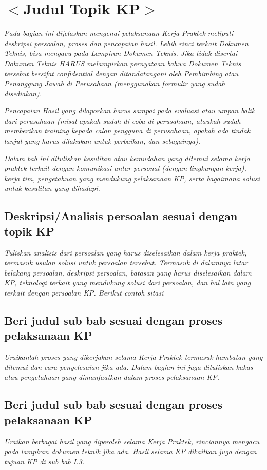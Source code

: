 \chapter{$<$Judul Topik KP$>$}
\textit{Pada bagian ini dijelaskan mengenai pelaksanaan Kerja Praktek meliputi deskripsi persoalan, proses dan pencapaian hasil. Lebih rinci terkait Dokumen Teknis, bisa mengacu pada Lampiran Dokumen Teknis. Jika tidak disertai Dokumen Teknis HARUS melampirkan pernyataan bahwa Dokumen Teknis tersebut bersifat confidential dengan ditandatangani oleh Pembimbing atau Penanggung Jawab di Perusahaan (menggunakan formulir yang sudah disediakan).
}

\textit{Pencapaian Hasil yang dilaporkan harus sampai pada evaluasi atau umpan balik dari perusahaan (misal apakah sudah di coba di perusahaan, ataukah sudah memberikan training kepada calon pengguna di perusahaan, apakah ada tindak lanjut yang harus dilakukan untuk perbaikan, dan sebagainya).
}

\textit{Dalam bab ini dituliskan kesulitan atau kemudahan yang ditemui selama kerja praktek terkait dengan komunikasi antar personal (dengan lingkungan kerja), kerja tim, pengetahuan yang mendukung pelaksanaan KP, serta bagaimana solusi untuk kesulitan yang dihadapi.}

\section{Deskripsi/Analisis persoalan sesuai dengan topik KP}
\textit{Tuliskan analisis dari persoalan yang harus diselesaikan dalam kerja praktek, termasuk usulan solusi untuk persoalan tersebut. Termasuk di dalamnya latar belakang persoalan, deskripsi persoalan, batasan yang harus diselesaikan dalam KP, teknologi terkait yang mendukung solusi dari persoalan, dan hal lain yang terkait dengan persoalan KP. Berikut contoh sitasi \cite{aws_ocr}}

\section{Beri judul sub bab sesuai dengan proses pelaksanaan KP}
\textit{Uraikanlah proses yang dikerjakan selama Kerja Praktek termasuk hambatan yang ditemui dan cara penyelesaian jika ada. Dalam bagian ini juga dituliskan kakas atau pengetahuan yang dimanfaatkan dalam proses pelaksanaan KP.}

\section{Beri judul sub bab sesuai dengan proses pelaksanaan KP}
\textit{Uraikan berbagai hasil yang diperoleh selama Kerja Praktek, rinciannya mengacu pada lampiran dokumen teknik jika ada. Hasil selama KP dikaitkan juga dengan tujuan KP di sub bab I.3.}